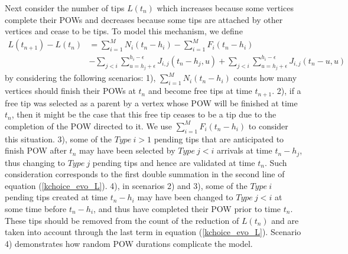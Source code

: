 \documentclass[12pt]{article}
\numberwithin{equation}{section}  %
\begin{document}
Next consider the number of tips $L(t_n)$ which increases because some vertices complete their POWs and decreases because some tips are attached by other vertices and cease to be tips. To model this mechanism, we define
\begin{align}
L(t_{n+1}) - L(t_n) &= \sum_{i=1}^M N_i(t_n-h_i) -\sum_{i=1}^M F_i(t_n-h_i)\nonumber\\
&-\sum_{j<i}\sum_{u=h_j+\epsilon}^{h_i-\epsilon}J_{i,j}(t_n-h_j,u)
+\sum_{j<i}\sum_{u=h_j+\epsilon}^{h_i-\epsilon}J_{i,j}(t_n-u,u)\label{kchoice_evo_L}
\end{align}
by considering the following scenarios: 1), $\sum_{i=1}^{M} N_i(t_n-h_i)$ counts how many vertices should finish their POWs at $t_n$ and become free tips at time $t_{n+1}$. 2), if a free tip was selected as a parent by a vertex whose POW will be finished at time $t_n$, then it might be the case that this free tip ceases to be a tip due to the completion of the POW directed to it. We use $\sum_{i=1}^M F_i(t_n-h_i)$ to consider this situation. 3), some of the {$Type\ i>1$} pending tips that are anticipated to finish POW after $t_{n}$ may have been selected by {$Type\ j<i$} arrivals at time $t_n-h_j$, thus changing to {$Type\ j$} pending tips and hence are validated at time $t_n$. Such consideration corresponds to the first double summation in the second line of equation (\ref{kchoice_evo_L}). 4), in scenarios 2) and 3), some of the {$Type\ i$} pending tips created at time $t_n - h_i$ may have been changed to {$Type\ j<i$} at some time before $t_n-h_i$, and thus have completed their POW prior to time $t_n$. These tips should be removed from the count of the reduction of $L(t_n)$ and are taken into account through the last term in equation (\ref{kchoice_evo_L}). Scenario 4) demonstrates how random POW durations complicate the model.
\end{document}
